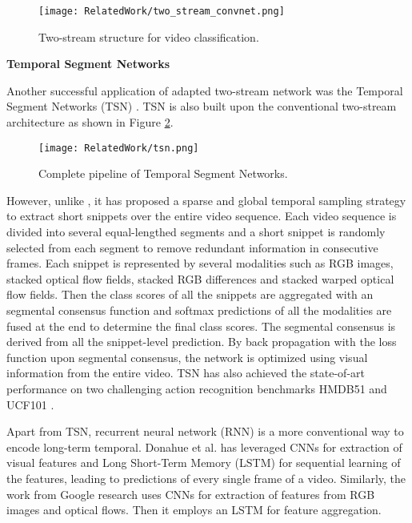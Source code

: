 \begin{figure}[h!]
  \centering
  \texttt{[image: RelatedWork/two\_stream\_convnet.png]}
  \caption{Two-stream structure for video classification. \cite{DBLP:journals/corr/SimonyanZ14}}
  \label{fig:two_stream_convnet}
\end{figure}


\textbf{Temporal Segment Networks}

Another successful application of adapted two-stream network was the Temporal Segment Networks (TSN) \cite{DBLP:journals/corr/WangXW0LTG16}. TSN is also built upon the conventional two-stream architecture as shown in Figure \ref{fig:tsn}.

\begin{figure}[H]
  \centering
  \texttt{[image: RelatedWork/tsn.png]}
  \caption{Complete pipeline of Temporal Segment Networks. \cite{DBLP:journals/corr/WangXW0LTG16}}
  \label{fig:tsn}
\end{figure} 

However, unlike \cite{DBLP:journals/corr/SimonyanZ14a}, it has proposed a sparse and global temporal sampling strategy to extract short snippets over the entire video sequence. Each video sequence is divided into several equal-lengthed segments and a short snippet is randomly selected from each segment to remove redundant information in consecutive frames. Each snippet is represented by several modalities such as RGB images, stacked optical flow fields, stacked RGB differences and stacked warped optical flow fields. Then the class scores of all the snippets are aggregated with an segmental consensus function and softmax predictions of all the modalities are fused at the end to determine the final class scores. The segmental consensus is derived from all the snippet-level prediction. By back propagation with the loss function upon segmental consensus, the network is optimized using visual information from the entire video. TSN has also achieved the state-of-art performance on two challenging action recognition benchmarks HMDB51 \cite{kuehne2011} and UCF101 \cite{Soomro2012}.

Apart from TSN, recurrent neural network (RNN) is a more conventional way to encode long-term temporal. Donahue et al. \cite{DBLP:journals/corr/DonahueHGRVSD14} has leveraged CNNs for extraction of visual features and Long Short-Term Memory (LSTM) \cite{Hochreiter1997} for sequential learning of the features, leading to predictions of every single frame of a video. Similarly, the work from Google research \cite{DBLP:journals/corr/NgHVVMT15} uses CNNs for extraction of features from RGB images and optical flows. Then it employs an LSTM for feature aggregation. \\


